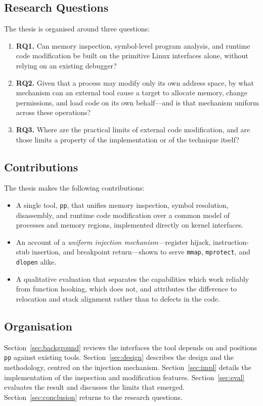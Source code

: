 \documentclass[10pt,twocolumn,a4paper]{article}
\begin{document}
\subsection{Research Questions}
The thesis is organised around three questions:
\begin{enumerate}
  \item \textbf{RQ1.} Can memory inspection, symbol-level program analysis, and
  runtime code modification be built on the primitive Linux interfaces alone,
  without relying on an existing debugger?
  \item \textbf{RQ2.} Given that a process may modify only its own address
  space, by what mechanism can an external tool cause a target to allocate
  memory, change permissions, and load code on its own behalf---and is that
  mechanism uniform across these operations?
  \item \textbf{RQ3.} Where are the practical limits of external code
  modification, and are those limits a property of the implementation or of the
  technique itself?
\end{enumerate}

\subsection{Contributions}
The thesis makes the following contributions:
\begin{itemize}
  \item A single tool, \texttt{pp}, that unifies memory inspection,
  symbol resolution, disassembly, and runtime code modification over a common
  model of processes and memory regions, implemented directly on kernel
  interfaces.
  \item An account of a \emph{uniform injection mechanism}---register hijack,
  instruction-stub insertion, and breakpoint return---shown to serve
  \texttt{mmap}, \texttt{mprotect}, and \texttt{dlopen} alike.
  \item A qualitative evaluation that separates the capabilities which work
  reliably from function hooking, which does not, and attributes the difference
  to relocation and stack alignment rather than to defects in the code.
\end{itemize}

\subsection{Organisation}
Section~\ref{sec:background} reviews the interfaces the tool depends on and
positions \texttt{pp} against existing tools. Section~\ref{sec:design}
describes the design and the methodology, centred on the injection mechanism.
Section~\ref{sec:impl} details the implementation of the inspection and
modification features. Section~\ref{sec:eval} evaluates the result and
discusses the limits that emerged. Section~\ref{sec:conclusion} returns to the
research questions.
\end{document}
